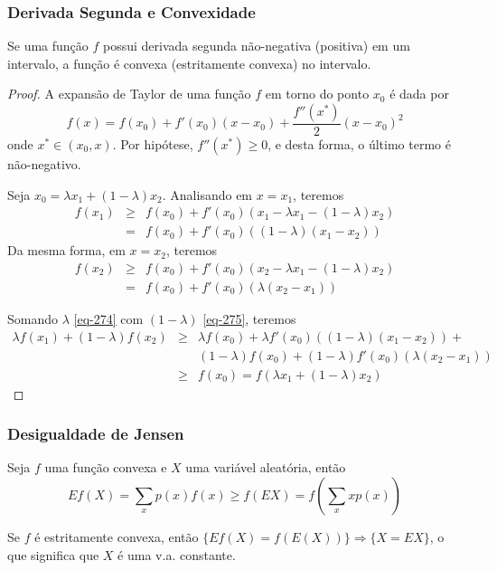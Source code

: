 \begin{frame}[allowframebreaks]
  \frametitle{Derivada Segunda e Convexidade}
  \begin{theorem}
  Se uma função $f$ possui derivada segunda não-negativa (positiva) em um intervalo,
  a função é convexa (estritamente convexa) no intervalo.
  \end{theorem}

  \begin{proof}
  A expansão de Taylor de uma função $f$ em torno do ponto $x_0$ é dada por
  \begin{equation}
  f(x) = f(x_0) + f'(x_0) (x-x_0) + \frac{f''(x^\ast)}{2} (x-x_0)^2
  \end{equation}
  onde $x^\ast \in (x_0,x)$. Por hipótese, $f''(x^\ast) \geq 0$, e desta forma,
  o último termo é não-negativo.

  \proofbreak

  Seja $x_0 = \lambda x_1 + (1-\lambda) x_2$. Analisando em $x=x_1$, teremos
  \begin{eqnarray}
    f(x_1) &\geq& f(x_0) + f'(x_0) (x_1 - \lambda x_1 - (1-\lambda)x_2) \nonumber \\
        &=& f(x_0) + f'(x_0) ((1-\lambda)(x_1-x_2)) \label{eq-274}
  \end{eqnarray}
  Da mesma forma, em $x=x_2$, teremos
  \begin{eqnarray}
    f(x_2) &\geq& f(x_0) + f'(x_0) (x_2 - \lambda x_1 - (1-\lambda)x_2) \nonumber \\
        &=& f(x_0) + f'(x_0) (\lambda(x_2-x_1)) \label{eq-275}
  \end{eqnarray}

  \proofbreak

  Somando $\lambda$ \ref{eq-274} com $(1-\lambda)$ \ref{eq-275}, teremos
  \begin{eqnarray}
  \lambda f(x_1) + (1-\lambda) f(x_2) &\geq& \lambda f(x_0) + \lambda f'(x_0) ((1-\lambda)(x_1-x_2)) + \nonumber \\
                        && (1-\lambda) f(x_0) + (1-\lambda) f'(x_0) (\lambda(x_2-x_1)) \nonumber \\
        &\geq& f(x_0) = f(\lambda x_1 + (1-\lambda) x_2)
  \end{eqnarray}

  \end{proof} 
\end{frame}

\begin{frame}%
  \frametitle{Desigualdade de Jensen}
  \begin{theorem}[Jensen]
  Seja $f$ uma função convexa e $X$ uma variável aleatória, então
  \begin{equation}
    E f(X) = \sum_x p(x) f(x) \geq f(E X) = f \left( \sum_x x p(x) \right)
  \end{equation}
  \end{theorem}

  Se $f$ é estritamente convexa, então $\{E f(X) = f(E(X))\} \Rightarrow \{X = EX\}$,
  o que significa que $X$ é uma v.a. constante.
\end{frame}

